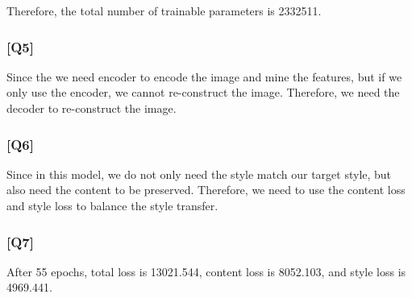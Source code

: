 \documentclass{article}
\begin{document}
Therefore, the total number of trainable parameters is 2332511.

\subsubsection*{[Q5]}
Since the we need encoder to encode the image and mine the features, but if we only use the encoder, we cannot re-construct the image. 
Therefore, we need the decoder to re-construct the image.

\subsubsection*{[Q6]}
Since in this model, we do not only need the style match our target style, but also need the content to be preserved.
Therefore, we need to use the content loss and style loss to balance the style transfer.

\subsubsection*{[Q7]}

After 55 epochs, total loss is 13021.544, content loss is 8052.103, and style loss is 4969.441.
\end{document}
